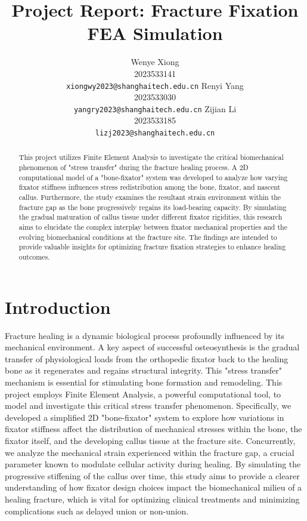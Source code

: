 \documentclass{article}
\title{Project Report: Fracture Fixation FEA Simulation}
\author{
  Wenye Xiong \\
  2023533141 \\
  \texttt{xiongwy2023@shanghaitech.edu.cn}
  \And
  Renyi Yang \\
  2023533030 \\
  \texttt{yangry2023@shanghaitech.edu.cn}
  \AND
  Zijian Li \\
  2023533185 \\
  \texttt{lizj2023@shanghaitech.edu.cn}
}
\begin{document}
\maketitle

\begin{abstract}
  This project utilizes Finite Element Analysis to investigate the critical biomechanical phenomenon of "stress transfer" during the fracture healing process. A 2D computational model of a "bone-fixator" system was developed to analyze how varying fixator stiffness influences stress redistribution among the bone, fixator, and nascent callus. Furthermore, the study examines the resultant strain environment within the fracture gap as the bone progressively regains its load-bearing capacity. By simulating the gradual maturation of callus tissue under different fixator rigidities, this research aims to elucidate the complex interplay between fixator mechanical properties and the evolving biomechanical conditions at the fracture site. The findings are intended to provide valuable insights for optimizing fracture fixation strategies to enhance healing outcomes.
\end{abstract}



\section{Introduction}

Fracture healing is a dynamic biological process profoundly influenced by its mechanical environment. A key aspect of successful osteosynthesis is the gradual transfer of physiological loads from the orthopedic fixator back to the healing bone as it regenerates and regains structural integrity. This "stress transfer" mechanism is essential for stimulating bone formation and remodeling. This project employs Finite Element Analysis, a powerful computational tool, to model and investigate this critical stress transfer phenomenon. Specifically, we developed a simplified 2D "bone-fixator" system to explore how variations in fixator stiffness affect the distribution of mechanical stresses within the bone, the fixator itself, and the developing callus tissue at the fracture site. Concurrently, we analyze the mechanical strain experienced within the fracture gap, a crucial parameter known to modulate cellular activity during healing. By simulating the progressive stiffening of the callus over time, this study aims to provide a clearer understanding of how fixator design choices impact the biomechanical milieu of a healing fracture, which is vital for optimizing clinical treatments and minimizing complications such as delayed union or non-union.
\end{document}
